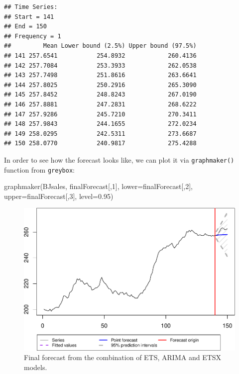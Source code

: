 \documentclass[
]{book}
\newenvironment{Shaded}{\begin{snugshade}}{\end{snugshade}}
\newcommand{\AttributeTok}[1]{\textcolor[rgb]{0.77,0.63,0.00}{#1}}
\newcommand{\DecValTok}[1]{\textcolor[rgb]{0.00,0.00,0.81}{#1}}
\newcommand{\FloatTok}[1]{\textcolor[rgb]{0.00,0.00,0.81}{#1}}
\newcommand{\FunctionTok}[1]{\textcolor[rgb]{0.00,0.00,0.00}{#1}}
\newcommand{\NormalTok}[1]{#1}
\theoremstyle{definition}
\theoremstyle{definition}
\theoremstyle{definition}
\theoremstyle{definition}
\theoremstyle{remark}
\begin{document}
\begin{verbatim}
## Time Series:
## Start = 141 
## End = 150 
## Frequency = 1 
##         Mean Lower bound (2.5%) Upper bound (97.5%)
## 141 257.6541           254.8932            260.4136
## 142 257.7084           253.3933            262.0538
## 143 257.7498           251.8616            263.6641
## 144 257.8025           250.2916            265.3090
## 145 257.8452           248.8243            267.0190
## 146 257.8881           247.2831            268.6222
## 147 257.9286           245.7210            270.3411
## 148 257.9843           244.1655            272.0234
## 149 258.0295           242.5311            273.6687
## 150 258.0770           240.9817            275.4288
\end{verbatim}

In order to see how the forecast looks like, we can plot it via \texttt{graphmaker()} function from \texttt{greybox}:

\begin{Shaded}
\begin{Highlighting}[]
\FunctionTok{graphmaker}\NormalTok{(BJsales, finalForecast[,}\DecValTok{1}\NormalTok{],}
           \AttributeTok{lower=}\NormalTok{finalForecast[,}\DecValTok{2}\NormalTok{], }\AttributeTok{upper=}\NormalTok{finalForecast[,}\DecValTok{3}\NormalTok{],}
           \AttributeTok{level=}\FloatTok{0.95}\NormalTok{)}
\end{Highlighting}
\end{Shaded}

\begin{figure}
\centering
\includegraphics{Svetunkov--2022----ADAM_files/figure-latex/adamCombinedfinalForecast-1.pdf}
\caption{\label{fig:adamCombinedfinalForecast}Final forecast from the combination of ETS, ARIMA and ETSX models.}
\end{figure}
\end{document}
